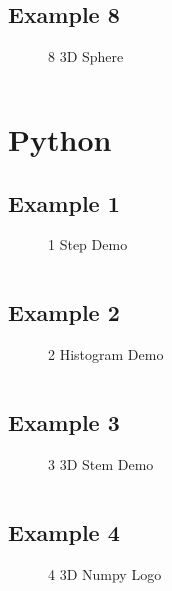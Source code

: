 \subsection{Example 8}
\begin{figure}[!htb]
    \centering
    
    \caption{8 3D Sphere}
    \label{fig:8-3d-sphere}
\end{figure}
\inputminted{mathematica}{./Example/example_8.wls}
\newpage


\section{Python}
\subsection{Example 1}
\begin{figure}[!htb]
    \centering
    
    \caption{1 Step Demo}
    \label{fig:1-step-demo}
\end{figure}
\inputminted{python}{./Example/example_1.mpl}
\newpage


\subsection{Example 2}
\begin{figure}[!htb]
    \centering
    
    \caption{2 Histogram Demo}
    \label{fig:2-histogram-demo}
\end{figure}
\inputminted{python}{./Example/example_2.mpl}
\newpage


\subsection{Example 3}
\begin{figure}[!htb]
    \centering
    
    \caption{3 3D Stem Demo}
    \label{fig:3-3d-stem-demo}
\end{figure}
\inputminted{python}{./Example/example_3.mpl}
\newpage

\subsection{Example 4}
\begin{figure}[!htb]
    \centering
    
    \caption{4 3D Numpy Logo}
    \label{fig:4-numpy-logo}
\end{figure}
\inputminted{python}{./Example/example_4.mpl}
\newpage


